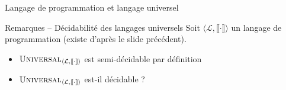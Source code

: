 \begin{frame}{Langage de programmation et langage universel}
  \pause
  
  \begin{alertblock}{Remarques -- Décidabilité des langages universels}
    Soit $\langle \mathcal{L}, \llbracket \cdot \rrbracket \rangle$ un langage de programmation (existe d'après le slide précédent). 

    \begin{itemize}
    \item $\textsc{Universal}_{\langle \mathcal{L}, \llbracket \cdot \rrbracket \rangle}$ est semi-décidable par définition
    \item $\textsc{Universal}_{\langle \mathcal{L}, \llbracket \cdot \rrbracket \rangle}$ est-il décidable ?
    \end{itemize}
  \end{alertblock}

\end{frame}

\endgroup
